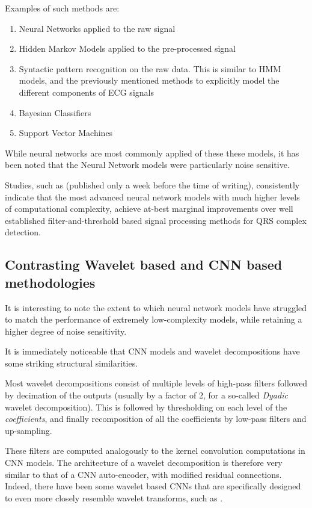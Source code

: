 \documentclass[9pt,conference]{IEEEtran}
\begin{document}
Examples of such methods are:
\begin{enumerate}
    \item Neural Networks applied to the raw signal
    \item Hidden Markov Models applied to the pre-processed signal
    \item Syntactic pattern recognition on the raw data. This is similar to HMM models, and the previously mentioned methods to explicitly model the different components of ECG signals
    \item Bayesian Classifiers
    \item Support Vector Machines
\end{enumerate}

While neural networks are most commonly applied of these these models, it has been noted that the Neural Network models were particularly noise sensitive.

Studies, such as \cite{dogan_dogan_2023} (published only a week before the time of writing), consistently indicate that the most advanced neural network models with much higher levels of computational complexity, achieve at-best marginal improvements over well established filter-and-threshold based signal processing methods for QRS complex detection.

\subsection{Contrasting Wavelet based and CNN based methodologies}
It is interesting to note the extent to which neural network models have struggled to match the performance of extremely low-complexity models, while retaining a higher degree of noise sensitivity.

It is immediately noticeable that CNN models and wavelet decompositions have some striking structural similarities.

Most wavelet decompositions consist of multiple levels of high-pass filters followed by decimation of the outputs (usually by a factor of 2, for a so-called \textit{Dyadic} wavelet decomposition). This is followed by thresholding on each level of the \textit{coefficients}, and finally recomposition of all the coefficients by low-pass filters and up-sampling.

These filters are computed analogously to the kernel convolution computations in CNN models. The architecture of a wavelet decomposition is therefore very similar to that of a CNN auto-encoder, with modified residual connections. Indeed, there have been some wavelet based CNNs that are specifically designed to even more closely resemble wavelet transforms, such as \cite{despawn}.
\end{document}
